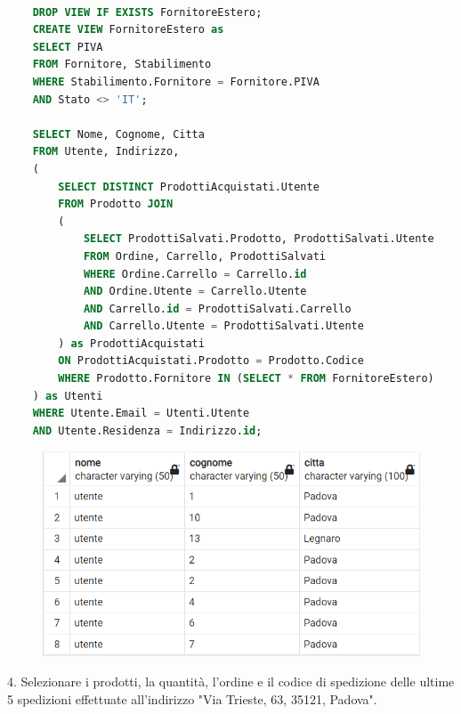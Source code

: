 \documentclass[10pt]{article}
\begin{document}
\begin{lstlisting}[language=SQL]

    DROP VIEW IF EXISTS FornitoreEstero;
    CREATE VIEW FornitoreEstero as
    SELECT PIVA
    FROM Fornitore, Stabilimento
    WHERE Stabilimento.Fornitore = Fornitore.PIVA
    AND Stato <> 'IT';

    SELECT Nome, Cognome, Citta
    FROM Utente, Indirizzo,
    (
        SELECT DISTINCT ProdottiAcquistati.Utente
        FROM Prodotto JOIN
        (
            SELECT ProdottiSalvati.Prodotto, ProdottiSalvati.Utente
            FROM Ordine, Carrello, ProdottiSalvati
            WHERE Ordine.Carrello = Carrello.id
            AND Ordine.Utente = Carrello.Utente
            AND Carrello.id = ProdottiSalvati.Carrello
            AND Carrello.Utente = ProdottiSalvati.Utente
        ) as ProdottiAcquistati
        ON ProdottiAcquistati.Prodotto = Prodotto.Codice
        WHERE Prodotto.Fornitore IN (SELECT * FROM FornitoreEstero)
    ) as Utenti
    WHERE Utente.Email = Utenti.Utente
    AND Utente.Residenza = Indirizzo.id;
\end{lstlisting}

\begin{center}
    \begin{figure}[H]
        \includegraphics[scale=1]{media/query3.png}
        \label{query3}
    \end{figure}
\end{center}
4. Selezionare i prodotti, la quantità, l'ordine e il codice di spedizione delle ultime 5
spedizioni effettuate all'indirizzo "Via Trieste, 63, 35121, Padova".
\end{document}
